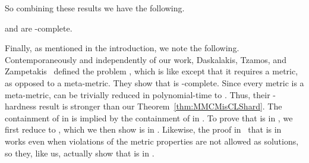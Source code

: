 So combining these results we have the following.

\begin{theorem}
\MMCM and \GCM are \CLS-complete.
\end{theorem}

Finally, as mentioned in the introduction, we note the following.
Contemporaneously and independently of our work, Daskalakis, Tzamos, and
Zampetakis~\cite{DTZ17} defined the problem \MBanach, which is like \MMCM except
that it requires a metric, as opposed to a meta-metric.  They show that \MBanach
is \CLS-complete.  Since every metric is a meta-metric, \MBanach can be
trivially reduced in polynomial-time to \MMCM. Thus, their \CLS-hardness result
is stronger than our Theorem~\ref{thm:MMCMisCLShard}.
The
containment of \MBanach in \CLS is implied by the containment of \MMCM in \CLS. 
To prove
that \MMCM is in \CLS, we first reduce to \GCM, which we then show is in \CLS.
Likewise, the proof in~\cite{DTZ17} that \MBanach is in \CLS works even when
violations of the metric properties are not allowed as solutions, so they, like
us, actually show that \GCM is in \CLS.
